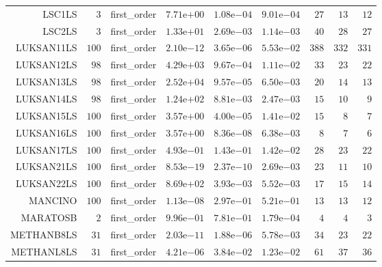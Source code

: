 \begin{longtable}{rrrrrrrrr}
LSC1LS & \(     3\) & first\_order & \( 7.71\)e\(+00\) & \( 1.08\)e\(-04\) & \( 9.01\)e\(-04\) & \(    27\) & \(    13\) & \(    12\) \\
LSC2LS & \(     3\) & first\_order & \( 1.33\)e\(+01\) & \( 2.69\)e\(-03\) & \( 1.14\)e\(-03\) & \(    40\) & \(    28\) & \(    27\) \\
LUKSAN11LS & \(   100\) & first\_order & \( 2.10\)e\(-12\) & \( 3.65\)e\(-06\) & \( 5.53\)e\(-02\) & \(   388\) & \(   332\) & \(   331\) \\
LUKSAN12LS & \(    98\) & first\_order & \( 4.29\)e\(+03\) & \( 9.67\)e\(-04\) & \( 1.11\)e\(-02\) & \(    33\) & \(    23\) & \(    22\) \\
LUKSAN13LS & \(    98\) & first\_order & \( 2.52\)e\(+04\) & \( 9.57\)e\(-05\) & \( 6.50\)e\(-03\) & \(    20\) & \(    14\) & \(    13\) \\
LUKSAN14LS & \(    98\) & first\_order & \( 1.24\)e\(+02\) & \( 8.81\)e\(-03\) & \( 2.47\)e\(-03\) & \(    15\) & \(    10\) & \(     9\) \\
LUKSAN15LS & \(   100\) & first\_order & \( 3.57\)e\(+00\) & \( 4.00\)e\(-05\) & \( 1.41\)e\(-02\) & \(    15\) & \(     8\) & \(     7\) \\
LUKSAN16LS & \(   100\) & first\_order & \( 3.57\)e\(+00\) & \( 8.36\)e\(-08\) & \( 6.38\)e\(-03\) & \(     8\) & \(     7\) & \(     6\) \\
LUKSAN17LS & \(   100\) & first\_order & \( 4.93\)e\(-01\) & \( 1.43\)e\(-01\) & \( 1.42\)e\(-02\) & \(    28\) & \(    23\) & \(    22\) \\
LUKSAN21LS & \(   100\) & first\_order & \( 8.53\)e\(-19\) & \( 2.37\)e\(-10\) & \( 2.69\)e\(-03\) & \(    23\) & \(    11\) & \(    10\) \\
LUKSAN22LS & \(   100\) & first\_order & \( 8.69\)e\(+02\) & \( 3.93\)e\(-03\) & \( 5.52\)e\(-03\) & \(    17\) & \(    15\) & \(    14\) \\
MANCINO & \(   100\) & first\_order & \( 1.13\)e\(-08\) & \( 2.97\)e\(-01\) & \( 5.21\)e\(-01\) & \(    13\) & \(    13\) & \(    12\) \\
MARATOSB & \(     2\) & first\_order & \( 9.96\)e\(-01\) & \( 7.81\)e\(-01\) & \( 1.79\)e\(-04\) & \(     4\) & \(     4\) & \(     3\) \\
METHANB8LS & \(    31\) & first\_order & \( 2.03\)e\(-11\) & \( 1.88\)e\(-06\) & \( 5.78\)e\(-03\) & \(    34\) & \(    23\) & \(    22\) \\
METHANL8LS & \(    31\) & first\_order & \( 4.21\)e\(-06\) & \( 3.84\)e\(-02\) & \( 1.23\)e\(-02\) & \(    61\) & \(    37\) & \(    36\) \\

\end{longtable}
